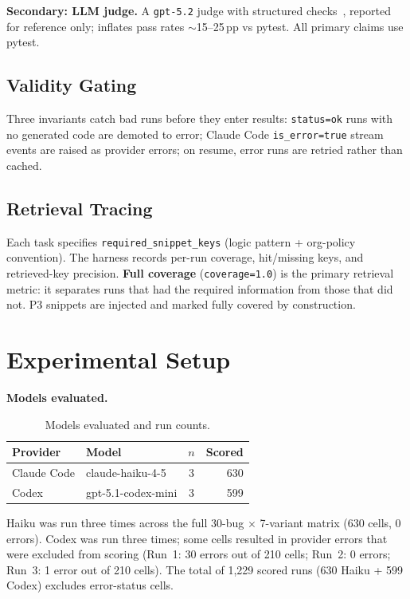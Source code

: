 \documentclass[10pt,a4paper,twocolumn]{article}
\begin{document}
\textbf{Secondary: LLM judge.} A \texttt{gpt-5.2} judge with structured checks~\citep{li2024llmjudge}, reported for reference only; inflates pass rates $\sim$15--25\,pp vs pytest. All primary claims use pytest.

\subsection{Validity Gating}
\label{sec:validity-gating}

Three invariants catch bad runs before they enter results: \texttt{status=ok} runs with no generated code are demoted to error; Claude Code \texttt{is\_error=true} stream events are raised as provider errors; on resume, error runs are retried rather than cached.

\subsection{Retrieval Tracing}
\label{sec:retrieval-tracing}

Each task specifies \texttt{required\_snippet\_keys} (logic pattern + org-policy convention). The harness records per-run coverage, hit/missing keys, and retrieved-key precision. \textbf{Full coverage} (\texttt{coverage=1.0}) is the primary retrieval metric: it separates runs that had the required information from those that did not. P3 snippets are injected and marked fully covered by construction.


\section{Experimental Setup}
\label{sec:setup}

\textbf{Models evaluated.}

\begin{table}[t]
\centering
\caption{Models evaluated and run counts.}
\label{tab:models}
\small
\begin{tabular}{@{}llcr@{}}
\toprule
\textbf{Provider} & \textbf{Model} & \textbf{$n$} & \textbf{Scored} \\
\midrule
Claude Code & claude-haiku-4-5   & 3 & 630 \\
Codex       & gpt-5.1-codex-mini & 3 & 599 \\
\bottomrule
\end{tabular}
\end{table}

Haiku was run three times across the full 30-bug $\times$ 7-variant matrix (630 cells, 0 errors).
Codex was run three times; some cells resulted in provider errors that were excluded from scoring (Run~1: 30 errors out of 210 cells; Run~2: 0 errors; Run~3: 1 error out of 210 cells).
The total of 1,229 scored runs (630 Haiku + 599 Codex) excludes error-status cells.
\end{document}
